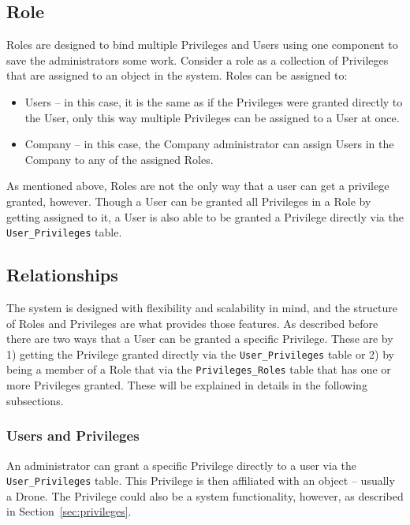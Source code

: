 \subsection{Role}
Roles are designed to bind multiple Privileges and Users using one component to save the administrators some work.
Consider a role as a collection of Privileges that are assigned to an object in the system.
Roles can be assigned to:

\begin{itemize}
    \item Users -- in this case, it is the same as if the Privileges were granted directly to the User, only this way multiple Privileges can be assigned to a User at once.
    \item Company -- in this case, the Company administrator can assign Users in the Company to any of the assigned Roles.
\end{itemize}

As mentioned above, Roles are not the only way that a user can get a privilege granted, however.
Though a User can be granted all Privileges in a Role by getting assigned to it, a User is also able to be granted a Privilege directly via the \verb+User_Privileges+ table.


\subsection{Relationships}
The system is designed with flexibility and scalability in mind, and the structure of Roles and Privileges are what provides those features.
As described before there are two ways that a User can be granted a specific Privilege.
These are by 1) getting the Privilege granted directly via the \verb+User_Privileges+ table or 2) by being a member of a Role that via the \verb+Privileges_Roles+ table that has one or more Privileges granted.
These will be explained in details in the following subsections.


\subsubsection*{Users and Privileges}
\label{sec:users_and_privileges}
An administrator can grant a specific Privilege directly to a user via the \verb+User_Privileges+ table.
This Privilege is then affiliated with an object -- usually a Drone.
The Privilege could also be a system functionality, however, as described in Section~\ref{sec:privileges}. \\

